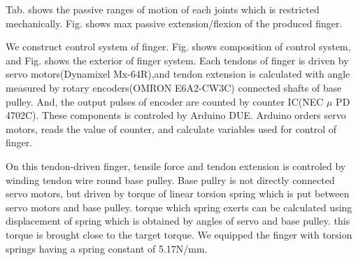 \documentclass{llncs}
\begin{document}
Tab. shows the passive ranges of motion of each joints which is restricted mechanically.
Fig. shows max passive extension/flexion of the produced finger.


		

We construct control system of finger.
Fig. shows composition of control system, and Fig. shows the exterior of finger system.
Each tendons of finger is driven by servo motors(Dynamixel Mx-64R),and
tendon extension is calculated with angle measured by rotary encoders(OMRON E6A2-CW3C) connected shafts of base pulley.
And, the output pulses of encoder are counted by counter IC(NEC $\mu$ PD 4702C).
These components is controled by Arduino DUE.
Arduino orders servo motors, reads the value of counter, and calculate variables used for control of finger.

On this tendon-driven finger, tensile force and tendon extension is controled by winding tendon wire round base pulley.
Base pullry is not directly connected servo motors, but driven by torque of linear torsion spring which is put between servo motors and base pulley.
torque which spring exerts can be calculated using displacement of spring which is obtained by angles of servo and base pulley.
this torque is brought close to the target torque.
We equipped the finger with torsion springs having a spring constant of 5.17N/mm.
\end{document}
